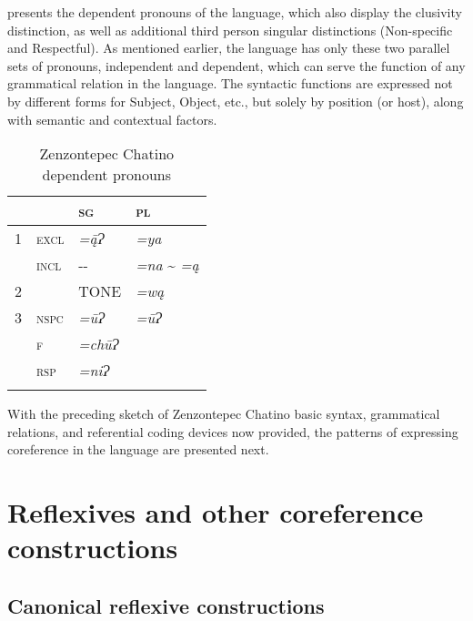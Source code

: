 \documentclass[output=paper]{../langscibook}
\begin{document}
 presents the dependent pronouns of the language, which also display the clusivity distinction, as well as additional third person singular distinctions (Non-specific and Respectful). As mentioned earlier, the language has only these two parallel sets of pronouns, independent and dependent, which can serve the function of any grammatical relation in the language. The syntactic functions are expressed not by different forms for Subject, Object, etc., but solely by position (or host), along with semantic and contextual factors.


\begin{table}
\caption{Zenzontepec Chatino dependent pronouns}
\label{tab:campbell:2}


\begin{tabularx}{0.37\textwidth}{p{0.2cm}p{0.6cm}XX}

\lsptoprule
&  & {\bfseries \textmd{\textsc{sg}}} & {\bfseries \textmd{\textsc{pl}}}\\
\hline
1 & \textsc{excl} & \textit{=ą̄Ɂ} & \textit{=ya}\\
& \textsc{incl} & {}-{}- & \textit{=na} {\textasciitilde} \textit{=ą}\\
2 &  & TONE & \textit{=wą}\\
3 & \textsc{nspc} & \textit{=ūɁ} & \textit{=ūɁ}\\
& \textsc{f} & \textit{=chūɁ} & \\
& \textsc{rsp} & \textit{=niɁ} & \\
\lspbottomrule
\end{tabularx}
\end{table}

With the preceding sketch of Zenzontepec Chatino basic syntax, grammatical relations, and referential coding devices now provided, the patterns of expressing coreference in the language are presented next.


\section{Reflexives and other coreference constructions}
\label{sec:campbell:4}
\subsection{Canonical reflexive constructions}
\label{sec:campbell:4.1}
\end{document}

